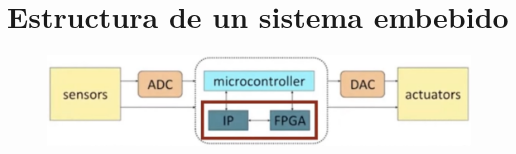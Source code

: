 \documentclass[12pt]{report} %
\begin{document}
\section{Estructura de un sistema embebido}

\begin{figure}[H]
	{\includegraphics[scale=.35]{2021-03-19 16_58_28-DSO Elementos Sistema embebido.mkv.png}}
\end{figure}
\end{document}
